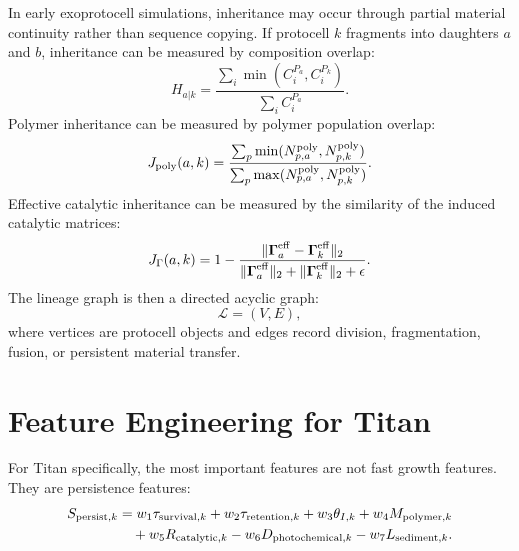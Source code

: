 \documentclass[11pt]{article}
\begin{document}
In early exoprotocell simulations, inheritance may occur through partial material continuity rather than sequence copying. If protocell $k$ fragments into daughters $a$ and $b$, inheritance can be measured by composition overlap:
\begin{equation}
H_{a|k}
=
\frac{\sum_i \min(C_i^{P_a},C_i^{P_k})}
{\sum_i C_i^{P_a}}.
\end{equation}
Polymer inheritance can be measured by polymer population overlap:
\begin{equation}
J_{\rm poly}(a,k)
=
\frac{
\sum_p \min(N^{\rm poly}_{p,a},N^{\rm poly}_{p,k})
}{
\sum_p \max(N^{\rm poly}_{p,a},N^{\rm poly}_{p,k})
}.
\end{equation}
Effective catalytic inheritance can be measured by the similarity of the induced catalytic matrices:
\begin{equation}
J_{\Gamma}(a,k)
=
1-
\frac{
\|\boldsymbol{\Gamma}^{\rm eff}_a-\boldsymbol{\Gamma}^{\rm eff}_k\|_2
}{
\|\boldsymbol{\Gamma}^{\rm eff}_a\|_2+
\|\boldsymbol{\Gamma}^{\rm eff}_k\|_2+\epsilon
}.
\end{equation}
The lineage graph is then a directed acyclic graph:
\begin{equation}
\mathcal{L}=(V,E),
\end{equation}
where vertices are protocell objects and edges record division, fragmentation, fusion, or persistent material transfer.

\section{Feature Engineering for Titan}

For Titan specifically, the most important features are not fast growth features. They are persistence features:
\begin{align}
S_{{\rm persist},k}
&=
w_1\tau_{{\rm survival},k}
+w_2\tau_{{\rm retention},k}
+w_3\theta_{I,k}
+w_4M_{{\rm polymer},k}
\nonumber\\
&\quad
+w_5R_{{\rm catalytic},k}
-w_6D_{{\rm photochemical},k}
-w_7L_{{\rm sediment},k}.
\end{align}
\end{document}
